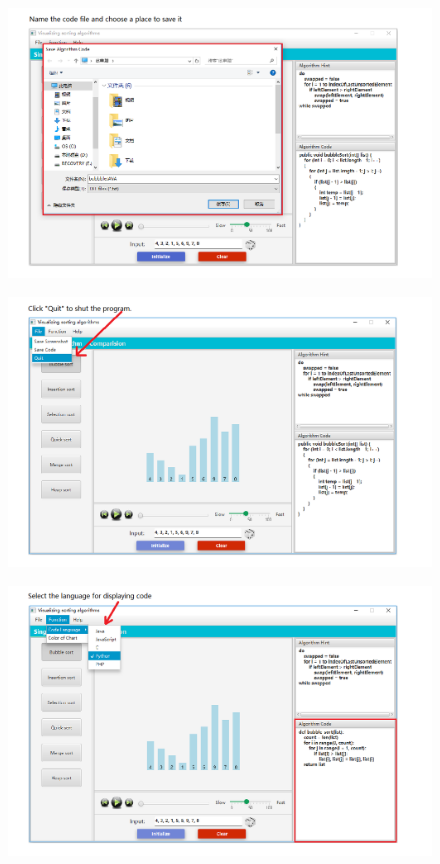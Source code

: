 \documentclass[paper=a4, fontsize=11pt,twoside]{scrartcl}		%
\begin{document}
\begin{figure}[htbp]
\centering
\includegraphics[width=1\textwidth]{user_menu/11.png}
\label{user_menu11}
\end{figure}

\begin{figure}[htbp]
\centering
\includegraphics[width=1\textwidth]{user_menu/12.png}
\label{user_menu12}
\end{figure}

\begin{figure}[htbp]
\centering
\includegraphics[width=1\textwidth]{user_menu/13.png}
\label{user_menu13}
\end{figure}
\end{document}
